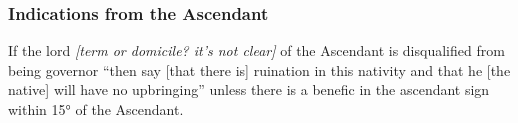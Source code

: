 \subsubsection{Indications from the Ascendant}
If  the lord \textsl{[term or domicile? it's not clear]} of the Ascendant is disqualified from being governor ``then say [that there is] ruination in this nativity and that he [the native] will have no upbringing'' unless there is a benefic in the ascendant sign within 15° of the Ascendant.

